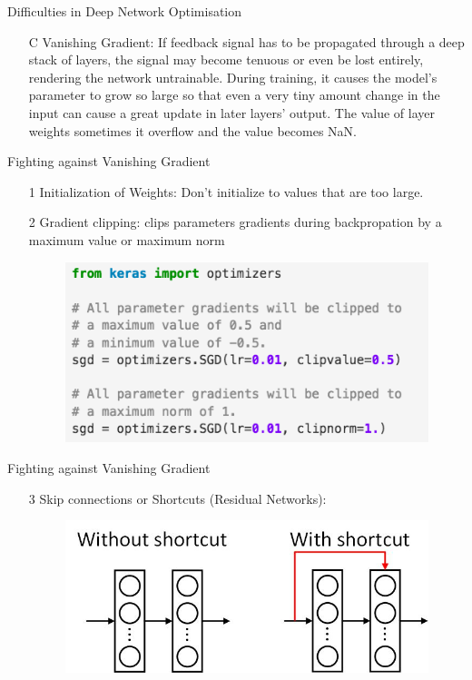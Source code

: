 \documentclass[xcolor=pdftex,dvipsnames,table,mathserif]{beamer}
\begin{document}
\begin{frame}{Difficulties in Deep Network Optimisation}
\begin{itemize}
\item[C] {Vanishing Gradient:} If feedback signal has to be propagated through a deep stack of layers, the signal may become tenuous or even be lost entirely, rendering the network untrainable. During training, it causes the model's parameter to grow so large so that even a very tiny amount change in the input can cause a great update in later layers' output. The value of layer weights sometimes it overflow and the value becomes \alert{NaN}.
\end{itemize}
\end{frame}


\begin{frame}{Fighting against Vanishing Gradient}
\begin{enumerate}
\item[1] Initialization of Weights: Don't initialize to values that are too large.
\item[2] Gradient clipping: clips parameters gradients during backpropation by a maximum value or maximum norm 
\begin{figure}
\includegraphics[width=.75\columnwidth]{../graphics/KerasClip}
\end{figure}
\end{enumerate}
\end{frame}

\begin{frame}{Fighting against Vanishing Gradient}
\begin{enumerate}
\item[3] Skip connections or Shortcuts (Residual Networks): 
\begin{figure}
\includegraphics[width=.65 \columnwidth]{../graphics/shortcut}
\end{figure}
\end{enumerate}
\end{frame}
\end{document}
